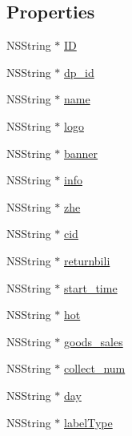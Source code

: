 \subsection*{Properties}
\begin{DoxyCompactItemize}
\item 
N\+S\+String $\ast$ \mbox{\hyperlink{interface_j_m_b_hot_sale_list_model_a653723f4e6b75ab2eb42e59687cbd6d6}{ID}}
\item 
N\+S\+String $\ast$ \mbox{\hyperlink{interface_j_m_b_hot_sale_list_model_a4dcbab02d0b4a876fb7b989d46351404}{dp\+\_\+id}}
\item 
N\+S\+String $\ast$ \mbox{\hyperlink{interface_j_m_b_hot_sale_list_model_af3100cdead9a703f018fcd4ab9548aec}{name}}
\item 
N\+S\+String $\ast$ \mbox{\hyperlink{interface_j_m_b_hot_sale_list_model_aa150d42e186aa43e832acf0db4046071}{logo}}
\item 
N\+S\+String $\ast$ \mbox{\hyperlink{interface_j_m_b_hot_sale_list_model_a89d2a0c9aa2eb12a2bde341db9e4d3a6}{banner}}
\item 
N\+S\+String $\ast$ \mbox{\hyperlink{interface_j_m_b_hot_sale_list_model_a9afbd66421f6852f01b2fe7eb023f46b}{info}}
\item 
N\+S\+String $\ast$ \mbox{\hyperlink{interface_j_m_b_hot_sale_list_model_aadf7e9e266359c091e85bacf73d555ec}{zhe}}
\item 
N\+S\+String $\ast$ \mbox{\hyperlink{interface_j_m_b_hot_sale_list_model_a00b5629bc549489be6d5ab0c640e59b3}{cid}}
\item 
N\+S\+String $\ast$ \mbox{\hyperlink{interface_j_m_b_hot_sale_list_model_a58d638057833d0ba2ed77e6b95d2ba53}{returnbili}}
\item 
N\+S\+String $\ast$ \mbox{\hyperlink{interface_j_m_b_hot_sale_list_model_ac1ea9c432a2adc8f0aabd8f26d3b933e}{start\+\_\+time}}
\item 
N\+S\+String $\ast$ \mbox{\hyperlink{interface_j_m_b_hot_sale_list_model_a37f704c4a9974c026d86949086d6d08f}{hot}}
\item 
N\+S\+String $\ast$ \mbox{\hyperlink{interface_j_m_b_hot_sale_list_model_ad7f3ddc583686029eff4c0032d3818fe}{goods\+\_\+sales}}
\item 
N\+S\+String $\ast$ \mbox{\hyperlink{interface_j_m_b_hot_sale_list_model_ae2fedddfbaad12191306cce5d52f7915}{collect\+\_\+num}}
\item 
N\+S\+String $\ast$ \mbox{\hyperlink{interface_j_m_b_hot_sale_list_model_ae3a5650a7c21188ca786c8cdc0099ace}{day}}
\item 
N\+S\+String $\ast$ \mbox{\hyperlink{interface_j_m_b_hot_sale_list_model_aa710ff41b78fea0fa485ce44683ac36f}{label\+Type}}
\end{DoxyCompactItemize}


